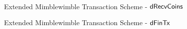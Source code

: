 \begin{landscape}
\begin{figure}
{{            \< \funStarAlt{\varSigContext} \opFunResult {} \< \\
            \< \varProofBobCarol \opFunResult \procDRProof{\funStarAlt{\varCoinShared}}{\varFundValue}{\varSecKeyAlice}{\varSecKeyBob} \< \\
            \< \varPreTx \opFunResult \procCreatePreTx{\varMsg}{\varInputs}{\varOutputs \opConc \funStarAlt{\varCoinShared}}{\varProofs \opConc \varProofBobCarol}{\funStarAlt{\varSigContext}}{\varCommits \opConc \varPubKeyBobCarol}{\varSigBobCarol}{\varTime} \< \\
            \pcreturn \varPreTx \< \< \pcreturn \varPreTx
            }
            }
        \caption{Extended Mimblewimble Transaction Scheme - $\mathsf{dRecvCoins}$ \label{fig:ext-mim-tx-recv}}
    \end{figure}
\end{landscape}
\restoregeometry

\begin{landscape}
    \begin{figure}
        \caption{Extended Mimblewimble Transaction Scheme - $\mathsf{dFinTx}$ \label{fig:ext-mim-tx-fin}}
    \end{figure}
\end{landscape}
\restoregeometry

